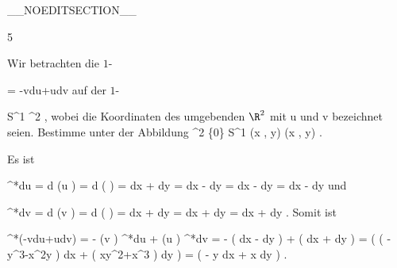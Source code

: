 __NOEDITSECTION__

{5}

{

Wir betrachten die
$1$-

\mavergleichskettedisp
{\vergleichskette
{ \omega
}
{ =} { -vdu+udv
}
{ } {
}
{ } {
}
{ } {
}
}
{}{}{}
auf der
$1$-

\mavergleichskette
{\vergleichskette
{ S^1
}
{ \subset }{ \R^2
}
{  }{
}
{    }{
}
{   }{
}
}
{}{}{,}
wobei die Koordinaten des umgebenden $\R^2$ mit
\mathkor {} {u} {und} {v} {}
bezeichnet seien. Bestimme
\mathl{\pi^* \omega}{} unter der
Abbildung
\maabbeledisp {\pi} {\R^2 \setminus \{0\}} { S^{1}
} {(x , y) } { {  } (x , y)
} {.}

}
{

Es ist

\mavergleichskettealign
{\vergleichskettealign
{ \pi^*du
}
{ =} { d (u \circ \pi)
}
{ =} { d   \left(  {  }  \right)
}
{ =} { {  }   dx + {  } dy
}
{ =} { {  }  dx   - {  }  dy
}
}
{
\vergleichskettefortsetzungalign
{ =} { {  }  dx  - {  }  dy
}
{ =} { {  }  dx  - {  }  dy
}
{ } {}
{ } {}
}
{}{}
und

\mavergleichskettealign
{\vergleichskettealign
{ \pi^*dv
}
{ =} { d (v \circ \pi)
}
{ =} { d \left(  {  }  \right)
}
{ =} { {  } dx + {  } dy
}
{ =} { {  } dx + {  } dy
}
}
{
\vergleichskettefortsetzungalign
{ =} { {  } dx + {  }  dy
}
{ } {
}
{ } {}
{ } {}
}
{}{.}
Somit ist

\mavergleichskettealigndrucklinks
{\vergleichskettealigndrucklinks
{ \pi^*(-vdu+udv)
}
{ =} { - (v \circ \pi)  \pi^*du + (u \circ \pi) \pi^*dv
}
{ =} { - {  } \left(  {  }  dx  - {  }  dy   \right) + {  }  \left(  {  } dx + {  } dy  \right)
}
{ =} { {  }  \left(  \left(  -y^3-x^2y  \right) dx + \left(  xy^2+x^3  \right) dy \right)
}
{ =} { {  }  \left(  -  y dx + x dy \right)
}
}
{}{}{.}

 }

